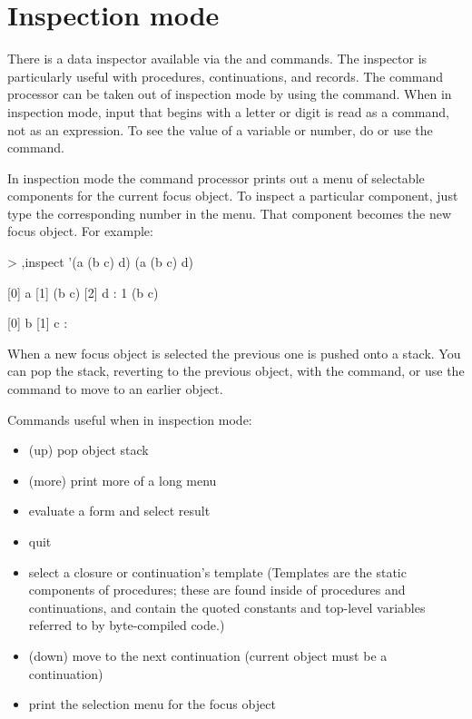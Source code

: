 \section{Inspection mode}
\label{inspector}

There is a data inspector available via the  and
  commands.
The inspector is particularly useful with procedures, continuations,
 and records.
The command processor can be taken out of inspection mode by
 using the  command.
When in inspection mode, input that begins with
  a letter or digit is read as a command, not as an expression.
To see the value of a variable or number, do 
  or use the  command.

In inspection mode the command processor prints out a
 menu of selectable components for the current focus object.
To inspect a particular component, just type the corresponding number in
 the menu.
That component becomes the new focus object.
For example:
\begin{example}
> ,inspect '(a (b c) d)
(a (b c) d)

[0] a
[1] (b c)
[2] d
: 1
(b c)

[0] b
[1] c
: 
\end{example}

When a new focus object is selected the previous one is pushed onto a
 stack.
You can pop the stack, reverting to the previous object, with
 the  command, or use the  command to move to
 an earlier object.

%

Commands useful when in inspection mode:
\begin{itemize}
\item{} (up) pop object stack
\item{} (more) print more of a long menu
\item\code{(\ldots)} evaluate a form and select result
\item{} quit
\item{} select a closure or continuation's template
 (Templates are the static components of procedures; these are found
  inside of procedures and continuations, and contain the quoted
  constants and top-level variables referred to by byte-compiled code.)
\item{} (down) move to the next continuation
 (current object must be a continuation)
\item{} print the selection menu for the focus object
\end{itemize}

